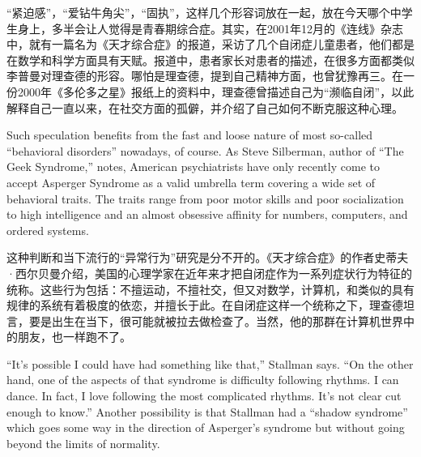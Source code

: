 \ifdefined\chs
“紧迫感”，“爱钻牛角尖”，“固执”，这样几个形容词放在一起，放在今天哪个中学生身上，多半会让人觉得是青春期综合症。其实，在2001年12月的《连线》杂志中，就有一篇名为《天才综合症》的报道，采访了几个自闭症儿童患者，他们都是在数学和科学方面具有天赋。报道中，患者家长对患者的描述，在很多方面都类似李普曼对理查德的形容。哪怕是理查德，提到自己精神方面，也曾犹豫再三。在一份2000年《多伦多之星》报纸上的资料中，理查德曾描述自己为“濒临自闭”，以此解释自己一直以来，在社交方面的孤僻，并介绍了自己如何不断克服这种心理。
\fi

\ifdefined\eng
Such speculation benefits from the fast and loose nature of most so-called ``behavioral disorders'' nowadays, of course. As Steve Silberman, author of ``The Geek Syndrome,'' notes, American psychiatrists have only recently come to accept Asperger Syndrome as a valid umbrella term covering a wide set of behavioral traits. The traits range from poor motor skills and poor socialization to high intelligence and an almost obsessive affinity for numbers, computers, and ordered systems.
\fi

\ifdefined\chs
这种判断和当下流行的“异常行为”研究是分不开的。《天才综合症》的作者史蒂夫·西尔贝曼介绍，美国的心理学家在近年来才把自闭症作为一系列症状行为特征的统称。这些行为包括：不擅运动，不擅社交，但又对数学，计算机，和类似的具有规律的系统有着极度的依恋，并擅长于此。在自闭症这样一个统称之下，理查德坦言，要是出生在当下，很可能就被拉去做检查了。当然，他的那群在计算机世界中的朋友，也一样跑不了。
\fi

\ifdefined\eng
``It's possible I could have had something like that,'' Stallman says. ``On the other hand, one of the aspects of that syndrome is difficulty following rhythms. I can dance. In fact, I love following the most complicated rhythms. It's not clear cut enough to know.''  Another possibility is that Stallman had a ``shadow syndrome'' which goes some way in the direction of Asperger's syndrome but without going beyond the limits of normality.
\fi

